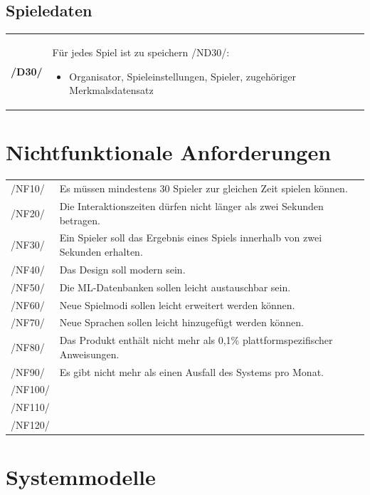 \documentclass[a4paper]{scrreprt}
\begin{document}
    \section{Spieledaten}
    \begin{tabularx}{\linewidth}{@{}>{\bfseries}l@{\hspace{.5em}}X@{}}
        /D30/ & Für jedes \Gls{Spiel} ist zu speichern /ND30/: \begin{itemize}
                                                                   \item \Gls{Organisator}, \Gls{Spieleinstellungen}, \Gls{Spieler}, zugehöriger Merkmalsdatensatz %
        \end{itemize}
    \end{tabularx}


    \chapter{Nichtfunktionale Anforderungen}

    \begin{tabular}{ l | l}
        /NF10/ & Es müssen mindestens 30 Spieler zur gleichen Zeit spielen können.\\
        /NF20/ & Die Interaktionszeiten dürfen nicht länger als zwei Sekunden betragen. \\
        /NF30/ & Ein Spieler soll das Ergebnis eines Spiels innerhalb von zwei Sekunden erhalten. \\
        /NF40/ & Das Design soll modern sein. \\
        /NF50/ & Die ML-Datenbanken sollen leicht austauschbar sein. \\
        /NF60/ & Neue Spielmodi sollen leicht erweitert werden können. \\
        /NF70/ & Neue Sprachen sollen leicht hinzugefügt werden können. \\
        /NF80/ & Das Produkt enthält nicht mehr als 0,1\% plattformspezifischer Anweisungen. \\
        /NF90/ & Es gibt nicht mehr als einen Ausfall des Systems pro Monat. \\ %
        /NF100/ & \\
        /NF110/ & \\
        /NF120/ & \\
    \end{tabular}

    \chapter{Systemmodelle}
\end{document}
